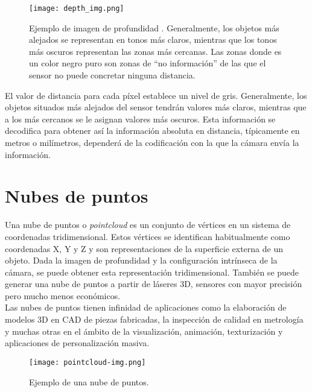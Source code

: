 \begin{figure}[H]
	\begin{center} 
		\texttt{[image: depth\_img.png]}
	\end{center}
	\caption{Ejemplo de imagen de profundidad \cite{depthimage}. Generalmente, los objetos más alejados se representan en tonos más claros, mientras que los tonos más oscuros representan las zonas más cercanas. Las zonas donde es un color negro puro son zonas de ``no información'' de las que el sensor no puede concretar ninguna distancia.}
	\label{fig:depth}
\end{figure}


El valor de distancia para cada píxel establece un nivel de gris. Generalmente, los objetos situados más alejados del sensor tendrán valores más claros, mientras que a los más cercanos se le asignan valores más oscuros. Esta información se decodifica para obtener así la información absoluta en distancia, típicamente en metros o milímetros, dependerá de la codificación con la que la cámara envía la información.\\

\section{Nubes de puntos}

Una nube de puntos o \textit{pointcloud} es un conjunto de vértices en un sistema de coordenadas tridimensional. Estos vértices se identifican habitualmente como coordenadas X, Y y Z y son representaciones de la superficie externa de un objeto. Dada la imagen de profundidad y la configuración intrínseca de la cámara, se puede obtener esta representación tridimensional. También se puede generar una nube de puntos a partir de láseres 3D, sensores con mayor precisión pero mucho menos económicos.\\

Las nubes de puntos tienen infinidad de aplicaciones como la elaboración de modelos 3D en CAD de piezas fabricadas, la inspección de calidad en metrología y muchas otras en el ámbito de la visualización, animación, texturización y aplicaciones de personalización masiva.\\

\begin{figure}[h]
	\begin{center} 
		\texttt{[image: pointcloud-img.png]}
	\end{center}
	\caption{Ejemplo de una nube de puntos. \cite{pointcloud_paper}}
	\label{fig:pc}
\end{figure}

